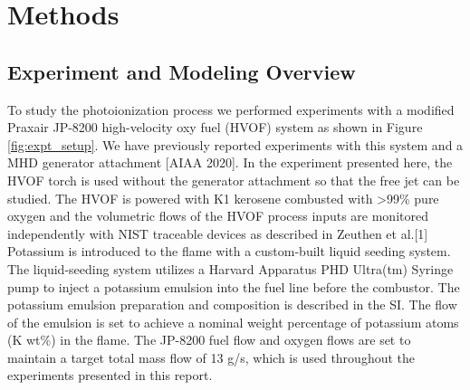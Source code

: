 \section{Methods}


\subsection{Experiment and Modeling Overview}

To study the photoionization process we performed experiments with a modified Praxair JP-8200 high-velocity oxy fuel (HVOF) system as shown in Figure \ref{fig:expt_setup}. We have previously reported experiments with this system and a MHD generator attachment [AIAA 2020]. In the experiment presented here, the HVOF torch is used without the generator attachment so that the free jet can be studied.  The HVOF is powered with K1 kerosene combusted with >99\% pure oxygen and the volumetric flows of the HVOF process inputs are monitored independently with NIST traceable devices as described in Zeuthen et al.[1] Potassium is introduced to the flame with a custom-built liquid seeding system. The liquid-seeding system utilizes a Harvard Apparatus PHD Ultra(tm) Syringe pump to inject a potassium emulsion into the fuel line before the combustor. The potassium emulsion preparation and composition is described in the SI. The flow of the emulsion is set to achieve a nominal weight percentage of potassium atoms (K wt\%) in the flame. The JP-8200 fuel flow and oxygen flows are set to maintain a target total mass flow of 13 g/s, which is used throughout the experiments presented in this report.

